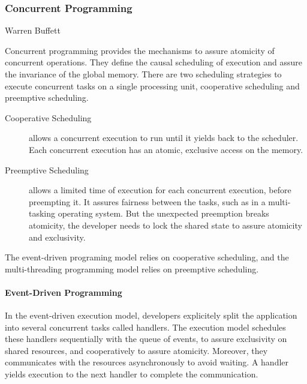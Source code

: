 \subsubsection{Concurrent Programming} \label{chapter3:software-efficiency:concurrency:concurrent-programming}


{Warren Buffett}

Concurrent programming provides the mechanisms to assure atomicity of concurrent operations.
They define the causal scheduling of execution and assure the invariance of the global memory.
There are two scheduling strategies to execute concurrent tasks on a single processing unit, cooperative scheduling and preemptive scheduling.

\begin{description}
\item[Cooperative Scheduling] allows a concurrent execution to run until it yields back to the scheduler.
Each concurrent execution has an atomic, exclusive access on the memory.
\item[Preemptive Scheduling] allows a limited time of execution for each concurrent execution, before preempting it.
It assures fairness between the tasks, such as in a multi-tasking operating system.
But the unexpected preemption breaks atomicity, the developer needs to lock the shared state to assure atomicity and exclusivity.
\end{description}

The event-driven programing model relies on cooperative scheduling, and the multi-threading programming model relies on preemptive scheduling.

\paragraph{Event-Driven Programming}

In the event-driven execution model, developers explicitely split the application into several concurrent tasks called handlers.
The execution model schedules these handlers sequentially with the queue of events, to assure exclusivity on shared resources, and cooperatively to assure atomicity.
Moreover, they communicates with the resources asynchronously to avoid waiting.
A handler yields execution to the next handler to complete the communication.


